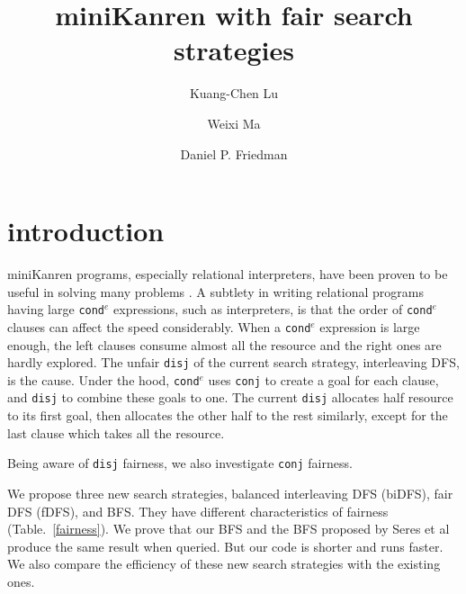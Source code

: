 \documentclass[format=acmlarge, review=true, authordraft=true]{acmart}
\title{miniKanren with fair search strategies}
\author{Kuang-Chen Lu}
\affiliation{Indiana University}
\author{Weixi Ma}
\affiliation{Indiana University}
\author{Daniel P. Friedman}
\affiliation{Indiana University}
\newcommand{\conde}{\texttt{cond$^e$} }
\newcommand{\disj}{\texttt{disj}}
\begin{document}
\begin{abstract}


\end{abstract}

\maketitle

\section{introduction}

miniKanren programs, especially relational interpreters, have been proven to be useful in solving many problems \citep{byrd2017unified}. A subtlety in writing relational programs having large \conde expressions, such as interpreters, is that the order of \conde clauses can affect the speed considerably. When a \conde expression is large enough, the left clauses consume almost all the resource and the right ones are hardly explored. The unfair \disj{} of the current search strategy, interleaving DFS, is the cause. Under the hood, \conde uses \texttt{conj} to create a goal for each clause, and \texttt{disj} to combine these goals to one. The current \texttt{disj} allocates half resource to its first goal, then allocates the other half to the rest similarly, except for the last clause which takes all the resource. 

Being aware of \texttt{disj} fairness, we also investigate \texttt{conj} fairness. 

We propose three new search strategies, balanced interleaving DFS (biDFS), fair DFS (fDFS), and BFS. They have different characteristics of fairness (Table.~\ref{fairness}). We prove that our BFS and the BFS proposed by Seres et al~\citep{seres1999algebra} produce the same result when queried. But our code is shorter and runs faster. We also compare the efficiency of these new search strategies with the existing ones.
 
\end{document}
